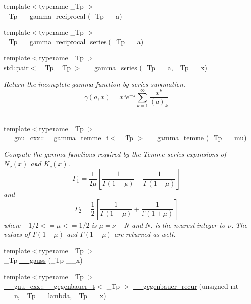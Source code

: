 \begin{DoxyCompactItemize}
{\footnotesize template$<$typename \+\_\+\+Tp $>$ }\\\+\_\+\+Tp \hyperlink{namespacestd_1_1____detail_a8ac187fda39e0c55614e4c58146f871c}{\+\_\+\+\_\+gamma\+\_\+reciprocal} (\+\_\+\+Tp \+\_\+\+\_\+a)
\item 
{\footnotesize template$<$typename \+\_\+\+Tp $>$ }\\\+\_\+\+Tp \hyperlink{namespacestd_1_1____detail_a08dc6d850e2f02ff45deaa4772298cf3}{\+\_\+\+\_\+gamma\+\_\+reciprocal\+\_\+series} (\+\_\+\+Tp \+\_\+\+\_\+a)
\item 
{\footnotesize template$<$typename \+\_\+\+Tp $>$ }\\std\+::pair$<$ \+\_\+\+Tp, \+\_\+\+Tp $>$ \hyperlink{namespacestd_1_1____detail_aa480c595e1c5b894d76398cf0e8eb02b}{\+\_\+\+\_\+gamma\+\_\+series} (\+\_\+\+Tp \+\_\+\+\_\+a, \+\_\+\+Tp \+\_\+\+\_\+x)
\begin{DoxyCompactList}\small\item\em Return the incomplete gamma function by series summation. \[ \gamma(a,x) = x^a e^{-z}\sum_{k=1}^{\infty} \frac{x^k}{(a)_k} \]. \end{DoxyCompactList}\item 
{\footnotesize template$<$typename \+\_\+\+Tp $>$ }\\\hyperlink{struct____gnu__cxx_1_1____gamma__temme__t}{\+\_\+\+\_\+gnu\+\_\+cxx\+::\+\_\+\+\_\+gamma\+\_\+temme\+\_\+t}$<$ \+\_\+\+Tp $>$ \hyperlink{namespacestd_1_1____detail_a0d4fa90f527fd05d057b27ba0366488a}{\+\_\+\+\_\+gamma\+\_\+temme} (\+\_\+\+Tp \+\_\+\+\_\+mu)
\begin{DoxyCompactList}\small\item\em Compute the gamma functions required by the Temme series expansions of $ N_\nu(x) $ and $ K_\nu(x) $. \[ \Gamma_1 = \frac{1}{2\mu} \left[\frac{1}{\Gamma(1 - \mu)} - \frac{1}{\Gamma(1 + \mu)}\right] \] and \[ \Gamma_2 = \frac{1}{2} \left[\frac{1}{\Gamma(1 - \mu)} + \frac{1}{\Gamma(1 + \mu)}\right] \] where $ -1/2 <= \mu <= 1/2 $ is $ \mu = \nu - N $ and $ N $. is the nearest integer to $ \nu $. The values of $ \Gamma(1 + \mu) $ and $ \Gamma(1 - \mu) $ are returned as well. \end{DoxyCompactList}\item 
{\footnotesize template$<$typename \+\_\+\+Tp $>$ }\\\+\_\+\+Tp \hyperlink{namespacestd_1_1____detail_afdb25beb2328b74d64d9be03de64c442}{\+\_\+\+\_\+gauss} (\+\_\+\+Tp \+\_\+\+\_\+x)
\item 
{\footnotesize template$<$typename \+\_\+\+Tp $>$ }\\\hyperlink{struct____gnu__cxx_1_1____gegenbauer__t}{\+\_\+\+\_\+gnu\+\_\+cxx\+::\+\_\+\+\_\+gegenbauer\+\_\+t}$<$ \+\_\+\+Tp $>$ \hyperlink{namespacestd_1_1____detail_a34e6b1cce7eca17d0929284577124747}{\+\_\+\+\_\+gegenbauer\+\_\+recur} (unsigned int \+\_\+\+\_\+n, \+\_\+\+Tp \+\_\+\+\_\+lambda, \+\_\+\+Tp \+\_\+\+\_\+x)

\end{DoxyCompactItemize}
